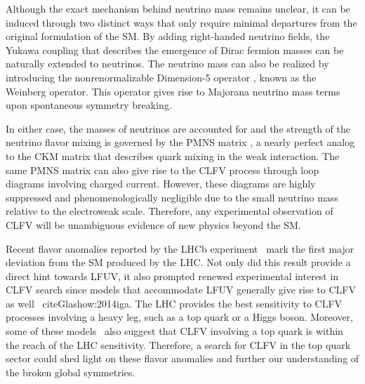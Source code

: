 Although the exact mechanism behind neutrino mass remains unclear, it can be induced through two distinct ways that only require minimal departures from the original formulation of the \ac{SM}. By adding right-handed neutrino fields, the Yukawa coupling \cite{Weinberg:1967tq} that describes the emergence of Dirac fermion masses can be naturally extended to neutrinos. The neutrino mass can also be realized by introducing the nonrenormalizable Dimension-5 operator \cite{Weinberg:1979sa}, known as the Weinberg operator. This operator gives rise to Majorana neutrino mass terms upon spontaneous symmetry breaking. 

In either case, the masses of neutrinos are accounted for and the strength of the neutrino flavor mixing is governed by the \ac{PMNS} matrix \cite{Pontecorvo:1957cp,Maki:1962mu}, a nearly perfect analog to the \ac{CKM} matrix \cite{Cabibbo:1963yz,Kobayashi:1973fv} that describes quark mixing in the weak interaction. The same \ac{PMNS} matrix can also give rise to the \ac{CLFV} process through loop diagrams involving charged current. However, these diagrams are highly suppressed and phenomenologically negligible due to the small neutrino mass relative to the electroweak scale. Therefore, any experimental observation of \ac{CLFV} will be unambiguous evidence of new physics beyond the \ac{SM}.

Recent flavor anomalies reported by the \ac{LHCb} experiment~\cite{LHCb:2023zxo} mark the first major deviation from the SM produced by the \ac{LHC}. Not only did this result provide a direct hint towards \ac{LFUV}, it also prompted renewed experimental interest in \ac{CLFV} search since models that accommodate \ac{LFUV} generally give rise to \ac{CLFV} as well ~cite{Glashow:2014iga}. The \ac{LHC} provides the best sensitivity to \ac{CLFV} processes involving a heavy leg, such as a top quark or a Higgs boson. Moreover, some of these models~\cite{Kim:2018oih} also suggest that \ac{CLFV} involving a top quark is within the reach of the \ac{LHC} sensitivity. Therefore, a search for \ac{CLFV} in the top quark sector could shed light on these flavor anomalies and further our understanding of the broken global symmetries.


